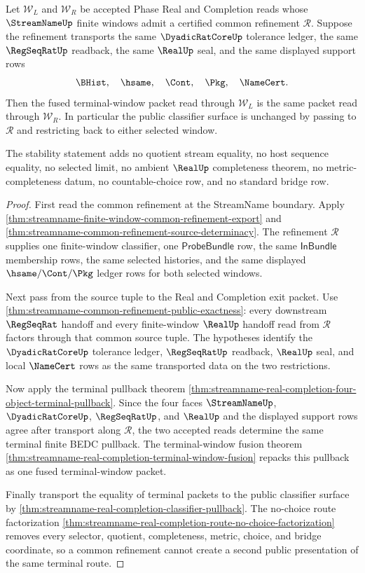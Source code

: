 \begin{theorem}
\label{thm:streamname-terminal-fusion-common-refinement-stability}
Let $\mathcal W_L$ and $\mathcal W_R$ be accepted Phase Real and Completion reads whose $\StreamNameUp$ finite windows admit a certified common refinement $\mathcal R$. Suppose the refinement transports the same $\DyadicRatCoreUp$ tolerance ledger, the same $\RegSeqRatUp$ readback, the same $\RealUp$ seal, and the same displayed support rows
$$
\BHist,\quad \hsame,\quad \Cont,\quad \Pkg,\quad \NameCert.
$$
Then the fused terminal-window packet read through $\mathcal W_L$ is the same packet read through $\mathcal W_R$. In particular the public classifier surface is unchanged by passing to $\mathcal R$ and restricting back to either selected window.

The stability statement adds no quotient stream equality, no host sequence equality, no selected limit, no ambient $\RealUp$ completeness theorem, no metric-completeness datum, no countable-choice row, and no standard bridge row.
\end{theorem}
\begin{proof}
First read the common refinement at the StreamName boundary. Apply \autoref{thm:streamname-finite-window-common-refinement-export} and \autoref{thm:streamname-common-refinement-source-determinacy}. The refinement $\mathcal R$ supplies one finite-window classifier, one $\mathsf{ProbeBundle}$ row, the same $\mathsf{InBundle}$ membership rows, the same selected histories, and the same displayed $\hsame/\Cont/\Pkg$ ledger rows for both selected windows.

Next pass from the source tuple to the Real and Completion exit packet. Use \autoref{thm:streamname-common-refinement-public-exactness}: every downstream $\RegSeqRat$ handoff and every finite-window $\RealUp$ handoff read from $\mathcal R$ factors through that common source tuple. The hypotheses identify the $\DyadicRatCoreUp$ tolerance ledger, $\RegSeqRatUp$ readback, $\RealUp$ seal, and local $\NameCert$ rows as the same transported data on the two restrictions.

Now apply the terminal pullback theorem \autoref{thm:streamname-real-completion-four-object-terminal-pullback}. Since the four faces $\StreamNameUp$, $\DyadicRatCoreUp$, $\RegSeqRatUp$, and $\RealUp$ and the displayed support rows agree after transport along $\mathcal R$, the two accepted reads determine the same terminal finite BEDC pullback. The terminal-window fusion theorem \autoref{thm:streamname-real-completion-terminal-window-fusion} repacks this pullback as one fused terminal-window packet.

Finally transport the equality of terminal packets to the public classifier surface by \autoref{thm:streamname-real-completion-classifier-pullback}. The no-choice route factorization \autoref{thm:streamname-real-completion-route-no-choice-factorization} removes every selector, quotient, completeness, metric, choice, and bridge coordinate, so a common refinement cannot create a second public presentation of the same terminal route.
\end{proof}

